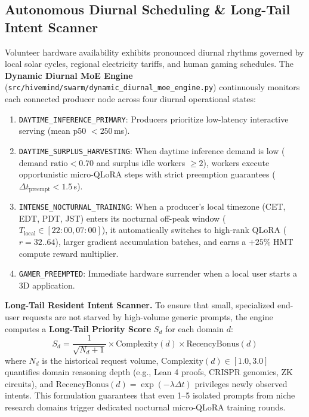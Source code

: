 \documentclass[11pt,a4paper]{article}
\begin{document}
\subsection{Autonomous Diurnal Scheduling \& Long-Tail Intent Scanner}
\label{sec:diurnal_moe_engine}

Volunteer hardware availability exhibits pronounced diurnal rhythms governed by local solar cycles, regional electricity tariffs, and human gaming schedules. The \textbf{Dynamic Diurnal MoE Engine} (\texttt{src/\allowbreak hivemind/\allowbreak swarm/\allowbreak dynamic\_diurnal\_moe\_engine.py}) continuously monitors each connected producer node across four diurnal operational states:

\begin{enumerate}[leftmargin=1.8em]
    \item \texttt{DAYTIME\_INFERENCE\_PRIMARY}: Producers prioritize low-latency interactive serving (mean p50 $< 250$\,ms).
    \item \texttt{DAYTIME\_SURPLUS\_HARVESTING}: When daytime inference demand is low ($\text{demand ratio} < 0.70$ and surplus idle workers $\ge 2$), workers execute opportunistic micro-QLoRA steps with strict preemption guarantees ($\Delta t_{\text{preempt}} < 1.5$\,s).
    \item \texttt{INTENSE\_NOCTURNAL\_TRAINING}: When a producer's local timezone (CET, EDT, PDT, JST) enters its nocturnal off-peak window ($T_{\text{local}} \in [22:00, 07:00]$), it automatically switches to high-rank QLoRA ($r = 32..64$), larger gradient accumulation batches, and earns a $+25\%$ HMT compute reward multiplier.
    \item \texttt{GAMER\_PREEMPTED}: Immediate hardware surrender when a local user starts a 3D application.
\end{enumerate}

\textbf{Long-Tail Resident Intent Scanner.} To ensure that small, specialized end-user requests are not starved by high-volume generic prompts, the engine computes a \textbf{Long-Tail Priority Score} $S_d$ for each domain $d$:
\begin{equation}
    S_d = \frac{1}{\sqrt{N_d + 1}} \times \text{Complexity}(d) \times \text{RecencyBonus}(d)
    \label{eq:long_tail_score}
\end{equation}
where $N_d$ is the historical request volume, $\text{Complexity}(d) \in [1.0, 3.0]$ quantifies domain reasoning depth (e.g., Lean 4 proofs, CRISPR genomics, ZK circuits), and $\text{RecencyBonus}(d) = \exp(-\lambda \Delta t)$ privileges newly observed intents. This formulation guarantees that even 1--5 isolated prompts from niche research domains trigger dedicated nocturnal micro-QLoRA training rounds.
\end{document}

